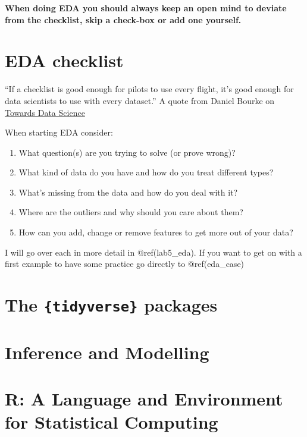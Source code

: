 \documentclass[]{book}
\providecommand{\tightlist}{%
  \setlength{\itemsep}{0pt}\setlength{\parskip}{0pt}}
\begin{document}
\textbf{When doing EDA you should always keep an open mind to deviate from the checklist, skip a check-box or add one yourself.}

\hypertarget{eda-checklist}{%
\section{EDA checklist}\label{eda-checklist}}

``If a checklist is good enough for pilots to use every flight, it's good enough for data scientists to use with every dataset.'' A quote from Daniel Bourke on \href{https://towardsdatascience.com/a-gentle-introduction-to-exploratory-data-analysis-f11d843b8184}{Towards Data Science}

When starting EDA consider:

\begin{enumerate}
\def\labelenumi{\arabic{enumi}.}
\tightlist
\item
  What question(s) are you trying to solve (or prove wrong)?
\item
  What kind of data do you have and how do you treat different types?
\item
  What's missing from the data and how do you deal with it?
\item
  Where are the outliers and why should you care about them?
\item
  How can you add, change or remove features to get more out of your data?
\end{enumerate}

I will go over each in more detail in @ref(lab5\_eda). If you want to get on with a first example to have some practice go directly to @ref(eda\_case)

\hypertarget{the-tidyverse-packages}{%
\section{\texorpdfstring{The \texttt{\{tidyverse\}} packages}{The \{tidyverse\} packages}}\label{the-tidyverse-packages}}

\hypertarget{inference-and-modelling}{%
\section{Inference and Modelling}\label{inference-and-modelling}}

\hypertarget{r-a-language-and-environment-for-statistical-computing}{%
\section{R: A Language and Environment for Statistical Computing}\label{r-a-language-and-environment-for-statistical-computing}}
\end{document}
